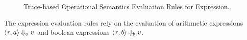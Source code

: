 \begin{figure}
 \caption{Trace-based Operational Semantics Evaluation Rules for Expression.}
 \label{fig:expr_eval}
\end{figure}

The expression evaluation rules rely on the evaluation of 
arithmetic expressions $\langle \mathtt{\tau},a \rangle \Downarrow_a v $ 
and boolean expressions $\langle \mathtt{\tau}, b \rangle \Downarrow_b v $.


